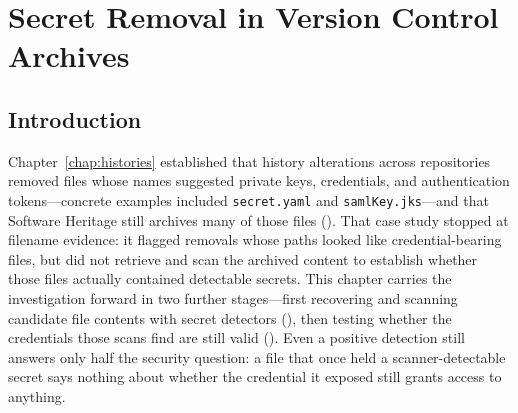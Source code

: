 %
%
\chapter{Secret Removal in Version Control Archives}
\label{chap:secrets}

\section{Introduction}
\label{sec:sec-intro}

Chapter~\ref{chap:histories} established that \SecretsRemovedAllShort history alterations across \SecretsOriginsAllShort repositories removed files whose names suggested private keys, credentials, and authentication tokens---concrete examples included \texttt{secret.yaml} and \texttt{samlKey.jks}---and that Software Heritage still archives many of those files ().
That case study stopped at filename evidence: it flagged removals whose paths looked like credential-bearing files, but did not retrieve and scan the archived content to establish whether those files actually contained detectable secrets.
This chapter carries the investigation forward in two further stages---first recovering and scanning candidate file contents with secret detectors (), then testing whether the credentials those scans find are still valid ().
Even a positive detection still answers only half the security question: a file that once held a scanner-detectable secret says nothing about whether the credential it exposed still grants access to anything.

